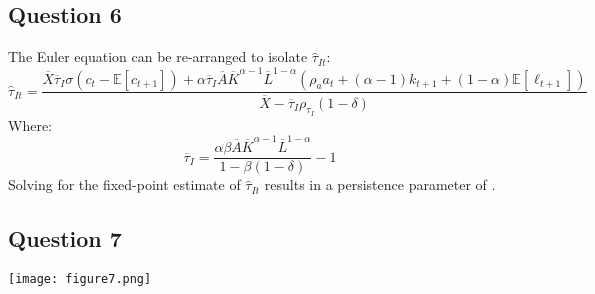 \documentclass{article}
\newcommand{\E}[1]{\mathbb{E}\left[#1\right]} %
\begin{document}
\subsection*{Question 6}
The Euler equation can be re-arranged to isolate $\hat{\tau}_{It}$:
\[
	\hat{\tau}_{It} = \frac{\overline{X}\overline{\tau}_I\sigma(c_t - \E{c_{t+1}}) + \alpha\overline{\tau}_I\overline{A}\overline{K}^{\alpha-1}\overline{L}^{1-\alpha}\left(\rho_aa_t + (\alpha-1)k_{t+1} + (1-\alpha)\E{\ell_{t+1}}\right)}{\overline{X} - \overline{\tau}_I\rho_{\tau_I}(1-\delta)}
\]
Where:
\[
	\overline{\tau}_I = \frac{\alpha\beta\overline{A}\overline{K}^{\alpha-1}\overline{L}^{1-\alpha}}{1-\beta(1-\delta)} - 1
\]
Solving for the fixed-point estimate of $\hat{\tau}_{It}$ results in a persistence parameter of .


\subsection*{Question 7}
\begin{center}\texttt{[image: figure7.png]}\end{center}


\end{document}
